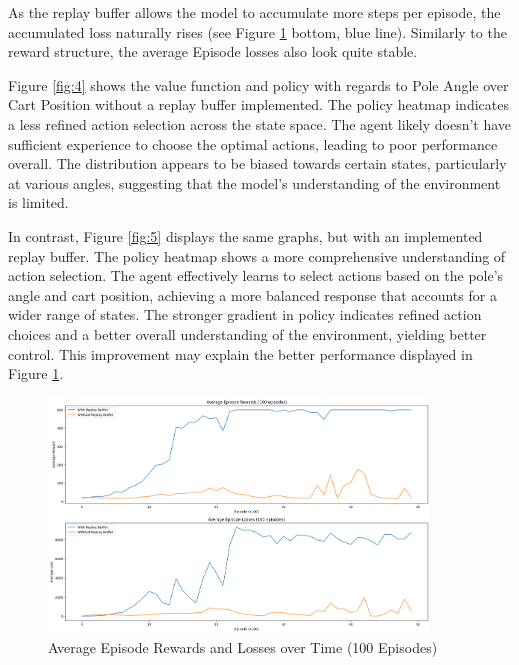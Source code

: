 \documentclass{article} %
\begin{document}
	As the replay buffer allows the model to accumulate more steps per episode, the accumulated loss naturally rises (see Figure \ref{fig:3} bottom, blue line). Similarly to the reward structure, the average Episode losses also look quite stable.
	
	
	Figure \ref{fig:4} shows the value function and policy with regards to Pole Angle over Cart Position without a replay buffer implemented. The policy heatmap indicates a less refined action selection across the state space. The agent likely doesn't have sufficient experience to choose the optimal actions, leading to poor performance overall.
	The distribution appears to be biased towards certain states, particularly at various angles, suggesting that the model's understanding of the environment is limited.
	
	In contrast, Figure \ref{fig:5} displays the same graphs, but with an implemented replay buffer. The policy heatmap shows a more comprehensive understanding of action selection. The agent effectively learns to select actions based on the pole's angle and cart position, achieving a more balanced response that accounts for a wider range of states.
	The stronger gradient in policy indicates refined action choices and a better overall understanding of the environment, yielding better control. This improvement may explain the better performance displayed in Figure \ref{fig:3}.
	
	
	\begin{figure}[h!]
		\centering
		\includegraphics[width=0.9\textwidth]{images/1b_1.png}
		\caption{Average Episode Rewards and Losses over Time (100 Episodes)}
		\label{fig:3}
	\end{figure}
	
\end{document}
